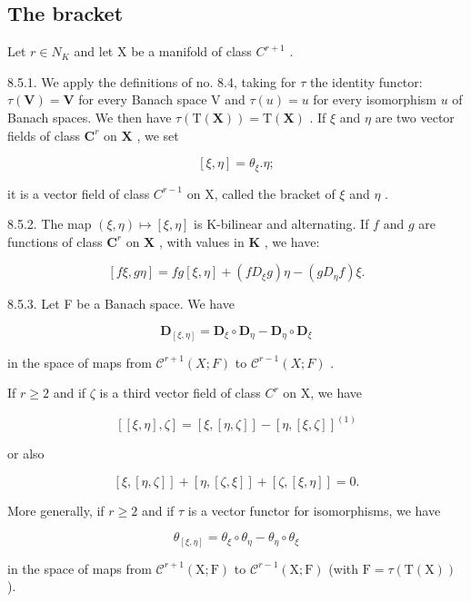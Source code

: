 \subsection{The bracket}

Let \(r \in N_{K}\) and let X be a manifold of class \(C^{r+1}\) .

8.5.1. We apply the definitions of no. 8.4, taking for \(\tau\) the identity functor: \(\tau(\mathbf{V}) = \mathbf{V}\) for every Banach space V and \(\tau(u) = u\) for every isomorphism \(u\) of Banach spaces. We then have \(\tau(\mathrm{T}(\mathbf{X})) = \mathrm{T}(\mathbf{X})\) . If \(\xi\) and \(\eta\) are two vector fields of class \(\mathbf{C}^r\) on \(\mathbf{X}\) , we set

\[
[ \xi , \eta ] = \theta_ {\xi}. \eta ;\tag{1}
\]

it is a vector field of class \(C^{r-1}\) on X, called the bracket of \(\xi\) and \(\eta\) .

8.5.2. The map \((\xi, \eta) \mapsto [\xi, \eta]\) is K-bilinear and alternating. If \(f\) and \(g\) are functions of class \(\mathbf{C}^r\) on \(\mathbf{X}\) , with values in \(\mathbf{K}\) , we have:

\[
[ f \xi , g \eta ] = f g [ \xi , \eta ] + (f D _ {\xi} g) \eta - (g D _ {\eta} f) \xi .\tag{2}
\]

8.5.3. Let F be a Banach space. We have

\[
\mathbf {D} _ {[ \xi , \eta ]} = \mathbf {D} _ {\xi} \circ \mathbf {D} _ {\eta} - \mathbf {D} _ {\eta} \circ \mathbf {D} _ {\xi}\tag{3}
\]

in the space of maps from \(\mathcal{C}^{r+1}(X;F)\) to \(\mathcal{C}^{r-1}(X;F)\) .

If \(r \geqslant 2\) and if \(\zeta\) is a third vector field of class \(C^r\) on X, we have

\[
[ [ \xi , \eta ], \zeta ] = [ \xi , [ \eta , \zeta ] ] - [ \eta , [ \xi , \zeta ] ] ^ {(1)}\tag{4}
\]

or also

\[
[ \xi , [ \eta , \zeta ] ] + [ \eta , [ \zeta , \xi ] ] + [ \zeta , [ \xi , \eta ] ] = 0.
\]

More generally, if \(r \geqslant 2\) and if \(\tau\) is a vector functor for isomorphisms, we have

\[
\theta_ {[ \xi , \eta ]} = \theta_ {\xi} \circ \theta _ {\eta} - \theta _ {\eta} \circ \theta_ {\xi}\tag{5}
\]

in the space of maps from \(\mathcal{C}^{r+1}(\mathrm{X};\mathrm{F})\) to \(\mathcal{C}^{r-1}(\mathrm{X};\mathrm{F})\) (with \(\mathrm{F} = \tau (\mathrm{T}(\mathrm{X}))\) ).

